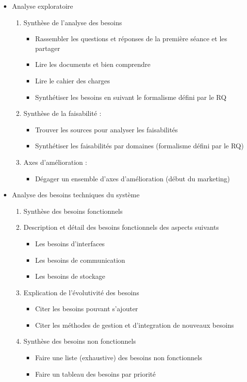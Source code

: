    \begin{itemize}
		\item Analyse exploratoire     
		\begin{enumerate}
			\item Synthèse de l'analyse des besoins 
			\begin{itemize}
				\item Rassembler les questions et réponses de la première séance et les partager
				\item Lire les documents et bien comprendre
				\item Lire le cahier des charges 
				\item Synthétiser les besoins en suivant le formalisme défini par le RQ
			\end{itemize}
			\item Synthèse de la faisabilité :
			\begin{itemize}
				\item Trouver les sources pour analyser les faisabilités
				\item Synthétiser les faisabilités par domaines (formalisme défini par le RQ)			
			\end{itemize}
			\item Axes d'amélioration :
			\begin{itemize}
				\item Dégager un ensemble d'axes d'amélioration (début du marketing)
			\end{itemize}
		\end{enumerate}
		
		
		\item Analyse des besoins techniques du système			 
		\begin{enumerate}
			\item Synthèse des besoins fonctionnels 	       
			\item Description et détail des besoins fonctionnels des aspects suivants
			\begin{itemize}
				\item Les besoins d'interfaces
				\item Les besoins de communication
				\item Les besoins de stockage
			\end{itemize}
			\item Explication de l'évolutivité des besoins
			\begin{itemize}
				\item Citer les besoins pouvant s'ajouter
				\item Citer les méthodes de gestion et d'integration de nouveaux besoins
			\end{itemize}	        
			\item Synthèse des besoins non fonctionnels
			\begin{itemize}
				\item Faire une liste (exhaustive) des besoins non fonctionnels
				\item Faire un tableau des besoins par priorité
			\end{itemize}
		\end{enumerate}	  
		  	

\end{itemize}
